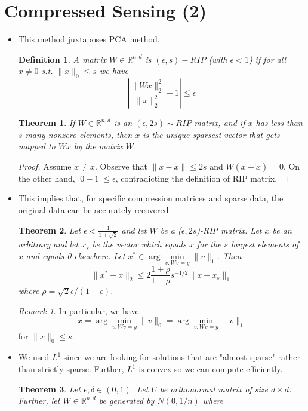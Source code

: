 \documentclass[11pt,reqno]{amsart}
\newtheorem{theorem}{Theorem}
\newtheorem{definition}{Definition}
\theoremstyle{remark}
\newtheorem{remark}[example]{Remark}
\begin{document}
\begin{sloppypar}
\section{Compressed Sensing (2)}
\begin{itemize}
\item This method juxtaposes PCA method.
\begin{definition}
A matrix $W\in \mathbb{R}^{n,d}$ is $(\epsilon, s)-RIP$ (with $\epsilon<1$) if for all $x\neq 0$ s.t. $\lVert x\rVert_0\leq s$
 we have 
 \[
|\frac{\lVert Wx\rVert^2_2}{\lVert x\rVert^2_2}-1|\leq \epsilon
 \]
\end{definition}
\begin{theorem}
If $W\in\mathbb{R}^{n,d}$ is an $(\epsilon, 2s)\sim RIP$ matrix, 
and if $x$ has less than $s$ many nonzero elements, then $x$ is the unique sparsest vector that
 gets mapped to $Wx$ by the matrix $W$.
\end{theorem}
\begin{proof}
Assume $\tilde x\neq x$. Observe that 
$\lVert x-\tilde x\rVert\leq 2s$ and $W(x-\tilde x)=0$. 
On the other hand, $\lvert 0-1\rvert\leq \epsilon$, contradicting 
the definition of RIP matrix.
\end{proof}
\item This implies that, for specific compression matrices and sparse data, the original data 
can be accurately recovered.
\begin{theorem}
Let $\epsilon<\frac 1{1+\sqrt{2}}$ and let $W$ be a ($\epsilon, 2s$)-RIP matrix. Let
 $x$ be an arbitrary and let $x_s$ be the vector which equals $x$ for the $s$ largest
  elements of $x$ and equals 0 elsewhere. Let $x^*\in \arg\min\limits_{v:Wv=y}\lVert
    v\rVert_1$. Then
\[
\lVert x^*-x\rVert_2\leq 2\frac{1+\rho}{1-\rho}s^{-1/2}\lVert x-x_s\rVert_1
\]
where $\rho=\sqrt{2}\epsilon/(1-\epsilon)$.
\end{theorem}
\begin{remark}
In particular, we have 
\[
x=\arg\min\limits_{v:Wv=y}\lVert
v\rVert_0=\arg\min\limits_{v:Wv=y}\lVert v\rVert_1
\]
for $\lVert x\rVert_0\leq s$.
\end{remark}
\item We used $L^1$ since we are looking for
solutions that are "almost sparse" rather than strictly sparse. Further, 
$L^1$ is convex so we can compute efficiently.
\begin{theorem}
Let $\epsilon, \delta\in(0,1)$.
Let $U$ be orthonormal matrix of size $d\times d$. Further, 
let $W\in\mathbb{R}^{n,d}$ be generated by $N(0,1/n)$ where 

\end{theorem}
\end{itemize}
\end{sloppypar}
\end{document}
